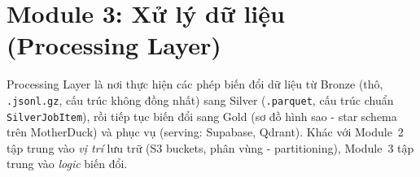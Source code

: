 
\usepackage[utf8]{inputenc}
\usepackage[T5]{fontenc}
\usepackage{listings}
\usepackage{xcolor}
\lstset{style=pystyle}

\usepackage{graphicx}
\usepackage{booktabs}
\usepackage{longtable}
\usepackage{hyperref}


\section{Module 3: Xử lý dữ liệu (Processing Layer)}
\label{sec:processing}

Processing Layer là nơi thực hiện các phép biến đổi dữ liệu từ
Bronze (thô, \texttt{.jsonl.gz}, cấu trúc không đồng nhất) sang Silver
(\texttt{.parquet}, cấu trúc chuẩn \texttt{SilverJobItem}), rồi tiếp tục
biến đổi sang Gold (sơ đồ hình sao - star schema trên MotherDuck) và phục vụ (serving: Supabase,
Qdrant). Khác với Module~2 tập trung vào \emph{vị trí} lưu trữ (S3 buckets,
phân vùng - partitioning), Module~3 tập trung vào \emph{logic} biến đổi.

